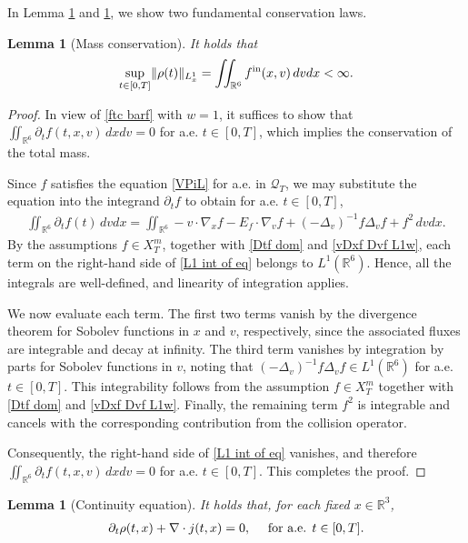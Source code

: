 \documentclass[reqno,11pt,final]{amsart}
\theoremstyle{plain}
\newtheorem{lemma}[theorem]{Lemma}
\numberwithin{equation}{section}
\numberwithin{theorem}{section}
\begin{document}
In Lemma \ref{mass conservation} and \ref{continuity eq}, we show two fundamental conservation laws.

\begin{lemma}[Mass conservation]\label{mass conservation} It holds that
\begin{align*}
\sup_{t\in[0,T]}\lVert \rho(t)\rVert_{L^1_x} = \iint_{\mathbb{R}^6} f^\textup{in}(x,v)\,dvdx<\infty.
\end{align*}
\end{lemma}

\begin{proof}
    In view of \eqref{ftc barf} with $w=1$, it suffices to show that $\iint_{\mathbb{R}^6}\partial_tf(t,x,v)\,dxdv = 0$ for a.e. $t\in[0,T]$, which implies the conservation of the total mass.
    
    Since $f$ satisfies the equation \eqref{VPiL} for a.e. in $\mathcal{Q}_T$, we may substitute the equation into the integrand $\partial_tf$ to obtain for a.e. $t\in[0,T]$,
    \begin{align}\label{L1 int of eq}
        \iint_{\mathbb{R}^6} \partial_tf(t)\,dvdx = \iint_{\mathbb{R}^6} -v\cdot\nabla_xf - E_f\cdot\nabla_vf + (-\Delta_v)^{-1}f\Delta_vf + f^2\,dvdx.
    \end{align}By the assumptions $f\in X_T^m$, together with \eqref{Dtf dom} and \eqref{vDxf Dvf L1w}, each term on the right-hand side of \eqref{L1 int of eq} belongs to $L^1(\mathbb{R}^6)$. Hence, all the integrals are well-defined, and linearity of integration applies. 
    
    We now evaluate each term. The first two terms vanish by the divergence theorem for Sobolev functions in $x$ and $v$, respectively, since the associated fluxes are integrable and decay at infinity. The third term vanishes by integration by parts for Sobolev functions in $v$, noting that $(-\Delta_v)^{-1}f\Delta_vf\in L^1(\mathbb{R}^6)$ for a.e. $t\in[0,T]$. This integrability follows from the assumption $f\in X_T^m$ together with \eqref{Dtf dom} and \eqref{vDxf Dvf L1w}. Finally, the remaining term $f^2$ is integrable and cancels with the corresponding contribution from the collision operator.

    Consequently, the right-hand side of \eqref{L1 int of eq} vanishes, and therefore $\iint_{\mathbb{R}^6} \partial_tf(t,x,v)\,dxdv = 0$ for a.e. $t\in[0,T]$. This completes the proof.
\end{proof}


\begin{lemma}[Continuity equation]\label{continuity eq} 
It holds that, for each fixed $x\in\mathbb{R}^3$,
\begin{align}\label{cont eq}
    \partial_t \rho(t,x)+\nabla\cdot j(t,x)=0, \quad \textup{ for a.e. } t\in [0,T].
\end{align}
\end{lemma}
\end{document}
